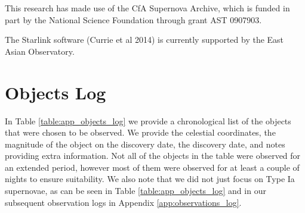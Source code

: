 \documentclass[twocolumn]{revtex4}
\begin{document}
This research has made use of the CfA Supernova Archive, which is funded in part by the National Science Foundation through grant AST 0907903.

The Starlink software (Currie et al 2014) is currently supported by the East Asian Observatory.

\vspace{-3ex}



\clearpage
\onecolumngrid
\vspace{-3ex}
\appendix
\section{Objects Log} \label{app:objects_log}
\vspace{-2ex}
In Table \ref{table:app_objects_log} we provide a chronological list of the objects that were chosen to be observed. We provide the celestial coordinates, the magnitude of the object on the discovery date, the discovery date, and notes providing extra information. Not all of the objects in the table were observed for an extended period, however most of them were observed for at least a couple of nights to ensure suitability. We also note that we did not just focus on Type Ia supernovae, as can be seen in Table \ref{table:app_objects_log} and in our subsequent observation logs in Appendix \ref{app:observations_log}.
\end{document}
